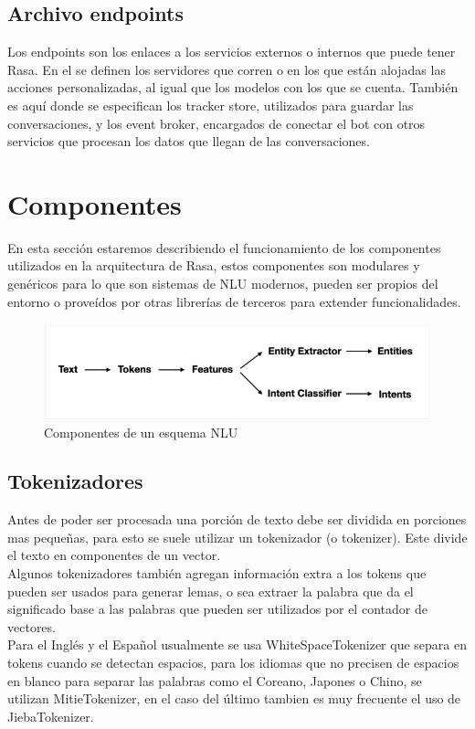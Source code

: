 \subsection{Archivo endpoints}
Los endpoints son los enlaces a los servicios externos o internos que puede tener Rasa. En el se definen los servidores que corren o en los que están alojadas las acciones personalizadas, al igual que los modelos con los que se cuenta. También es aquí donde se especifican los tracker store, utilizados para guardar las conversaciones, y los event broker, encargados de conectar el bot con otros servicios que procesan los datos que llegan de las conversaciones.

\section{Componentes}\label{ch:Componentes}
En esta sección estaremos describiendo el funcionamiento de los componentes utilizados en la arquitectura de Rasa, 
estos componentes son modulares y genéricos para lo que son sistemas de NLU modernos, pueden ser propios del
entorno o proveídos por otras librerías de terceros para extender funcionalidades.

\begin{figure}[h]
    \centering
    \includegraphics[width=\textwidth]{imagenes/cap3/rasa_components.png}   
    \caption{Componentes de un esquema NLU}
    \label{fig:Componentes-MLU}
\end{figure}

\subsection{Tokenizadores}
Antes de poder ser procesada una porción de texto debe ser dividida en porciones mas pequeñas, para esto se suele utilizar 
un tokenizador (o tokenizer).   Este divide el texto en componentes de un vector.\\ Algunos tokenizadores también
agregan información extra a los tokens que pueden ser usados para generar lemas, o sea extraer la palabra que da el significado base a las palabras que pueden ser utilizados por el contador de vectores.\\
Para el Inglés y el Español usualmente se usa WhiteSpaceTokenizer que separa en tokens cuando se detectan espacios, para los idiomas que no precisen de espacios en blanco para separar las palabras como el Coreano, Japones o Chino, se utilizan MitieTokenizer, en el caso del último tambien es muy frecuente el uso de JiebaTokenizer.\cite{warmerdam_2022}

